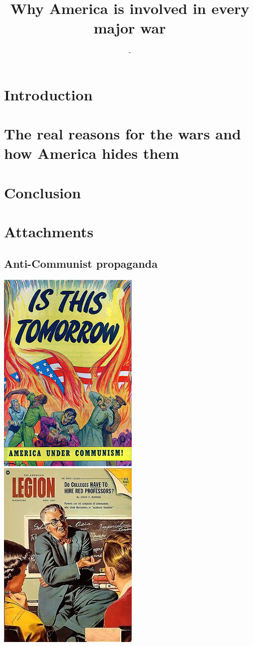 \documentclass[12pt,a4paper]{article}
\title{Why America is involved in every major war}
\author{-}
\begin{document}
	
	\clearpage
	\newpage
	\tableofcontents
	\newpage
	\section{Introduction}
		
	\section{The real reasons for the wars and how America hides them}
		
		
	\section{Conclusion}
		
	
	\section{Attachments}
	\subsection{Anti-Communist propaganda}
	\label{sec:Propaganda}
	\includegraphics{Propaganda/is-this-tomorrow.jpg}
	\includegraphics{Propaganda/colleges-hire-red-professors.jpg}
	\printbibliography
	
	\newpage
	
	
\end{document}
